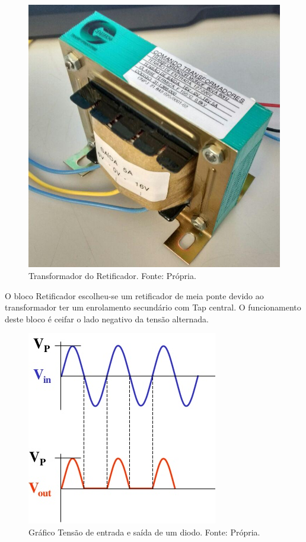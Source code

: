                 \begin{figure}[!htb]
            		\centering
            		\includegraphics[scale= 0.3]{figuras/Transformador.png}
            		\caption{Transformador do Retificador. Fonte: Própria.}
            		\label{transformador-retificador}
            	\end{figure}	
            	
            	O bloco Retificador escolheu-se um retificador de meia ponte devido ao 							transformador ter um enrolamento secundário com Tap central. O funcionamento 					deste bloco é ceifar o lado negativo da tensão alternada. 			

                \begin{figure}[!htb]
            		\centering
            		\includegraphics[scale= 0.5]{figuras/Retificador.png}
            		\caption{Gráfico Tensão de entrada e saída de um diodo. Fonte: Própria.}
            		\label{retificador}
            	\end{figure}		
            	
